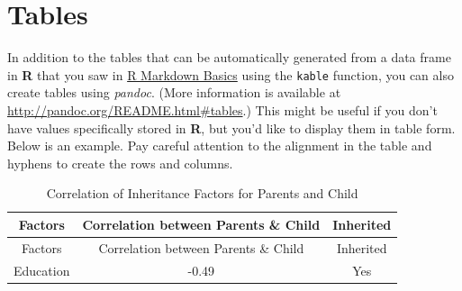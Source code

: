 \documentclass[12pt,twoside]{reedthesis}
\theoremstyle{definition}
\theoremstyle{definition}
\theoremstyle{definition}
\theoremstyle{remark}
\begin{document}
\section{Tables}\label{tables}

In addition to the tables that can be automatically generated from a
data frame in \textbf{R} that you saw in
\protect\hyperlink{rmd-basics}{R Markdown Basics} using the
\texttt{kable} function, you can also create tables using \emph{pandoc}.
(More information is available at
\url{http://pandoc.org/README.html\#tables}.) This might be useful if
you don't have values specifically stored in \textbf{R}, but you'd like
to display them in table form. Below is an example. Pay careful
attention to the alignment in the table and hyphens to create the rows
and columns.
\begin{longtable}[]{@{}ccc@{}}
\caption{\label{tab:inher} Correlation of Inheritance Factors for Parents
and Child}\tabularnewline
\toprule
\begin{minipage}[b]{0.29\columnwidth}\centering\strut
Factors\strut
\end{minipage} & \begin{minipage}[b]{0.47\columnwidth}\centering\strut
Correlation between Parents \& Child\strut
\end{minipage} & \begin{minipage}[b]{0.16\columnwidth}\centering\strut
Inherited\strut
\end{minipage}\tabularnewline
\midrule
\endfirsthead
\toprule
\begin{minipage}[b]{0.29\columnwidth}\centering\strut
Factors\strut
\end{minipage} & \begin{minipage}[b]{0.47\columnwidth}\centering\strut
Correlation between Parents \& Child\strut
\end{minipage} & \begin{minipage}[b]{0.16\columnwidth}\centering\strut
Inherited\strut
\end{minipage}\tabularnewline
\midrule
\endhead
\begin{minipage}[t]{0.29\columnwidth}\centering\strut
Education\strut
\end{minipage} & \begin{minipage}[t]{0.47\columnwidth}\centering\strut
-0.49\strut
\end{minipage} & \begin{minipage}[t]{0.16\columnwidth}\centering\strut
Yes\strut
\end{minipage}\tabularnewline

\end{longtable}
\end{document}
